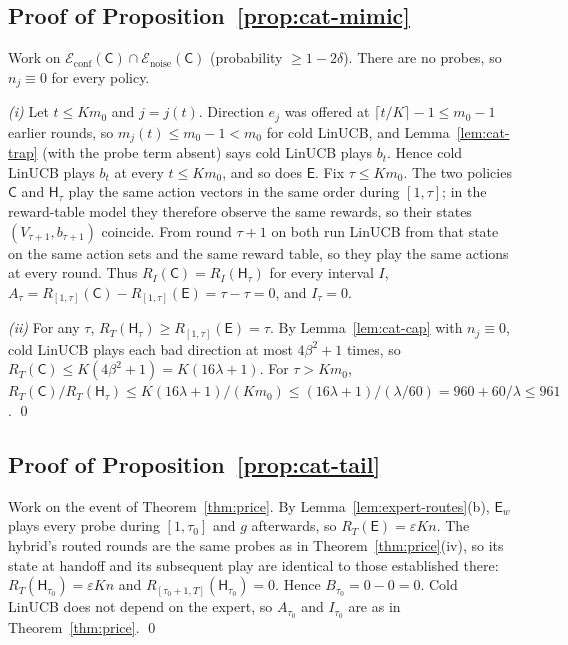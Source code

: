 \documentclass{article}
\theoremstyle{definition}
\theoremstyle{remark}
\newcommand{\eps}{\varepsilon}
\theoremstyle{remark}
\newcommand{\Cold}{\mathsf{C}}
\newcommand{\Exp}{\mathsf{E}}
\newcommand{\Hyb}{\mathsf{H}}
\begin{document}
\subsection{Proof of Proposition~\ref{prop:cat-mimic}}

Work on $\mathcal E_{\mathrm{conf}}(\Cold)\cap\mathcal E_{\mathrm{noise}}(\Cold)$
(probability $\ge1-2\delta$). There are no probes, so $n_j\equiv0$ for every
policy.

\emph{(i)} Let $t\le Km_0$ and $j=j(t)$. Direction $e_j$ was offered at
$\lceil t/K\rceil-1\le m_0-1$ earlier rounds, so $m_j(t)\le m_0-1<m_0$ for cold
LinUCB, and Lemma~\ref{lem:cat-trap} (with the probe term absent) says cold
LinUCB plays $b_t$. Hence cold LinUCB plays $b_t$ at every $t\le Km_0$, and
so does $\Exp$. Fix $\tau\le Km_0$. The two policies $\Cold$ and $\Hyb_\tau$
play the same action vectors in the same order during $[1,\tau]$; in the
reward-table model they therefore observe the same rewards, so their states
$(V_{\tau+1},b_{\tau+1})$ coincide. From round $\tau+1$ on both run LinUCB
from that state on the same action sets and the same reward table, so they
play the same actions at every round. Thus $R_I(\Cold)=R_I(\Hyb_\tau)$ for every
interval $I$, $A_\tau=R_{[1,\tau]}(\Cold)-R_{[1,\tau]}(\Exp)=\tau-\tau=0$, and $I_\tau=0$.

\emph{(ii)} For any $\tau$, $R_T(\Hyb_\tau)\ge R_{[1,\tau]}(\Exp)=\tau$. By
Lemma~\ref{lem:cat-cap} with $n_j\equiv0$, cold LinUCB plays each bad
direction at most $4\beta^2+1$ times, so $R_T(\Cold)\le K(4\beta^2+1)=K(16\lambda+1)$.
For $\tau>Km_0$, $R_T(\Cold)/R_T(\Hyb_\tau)\le K(16\lambda+1)/(Km_0)\le(16\lambda+1)/(\lambda/60)=960+60/\lambda\le961$. \qed

\subsection{Proof of Proposition~\ref{prop:cat-tail}}

Work on the event of Theorem~\ref{thm:price}. By Lemma~\ref{lem:expert-routes}(b),
$\Exp_w$ plays every probe during $[1,\tau_0]$ and $g$ afterwards, so
$R_T(\Exp)=\eps Kn$. The hybrid's routed rounds are the same probes as in
Theorem~\ref{thm:price}(iv), so its state at handoff and its subsequent play
are identical to those established there: $R_T(\Hyb_{\tau_0})=\eps Kn$ and
$R_{[\tau_0+1,T]}(\Hyb_{\tau_0})=0$. Hence $B_{\tau_0}=0-0=0$. Cold LinUCB does not
depend on the expert, so $A_{\tau_0}$ and $I_{\tau_0}$ are as in
Theorem~\ref{thm:price}. \qed
\end{document}
